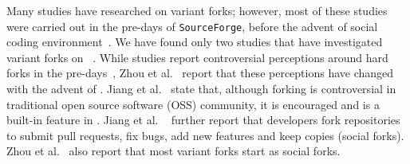 Many studies have researched on variant forks; however, most of these studies were carried out in the pre-\scp days of \texttt{SourceForge}, before the advent of social coding environment~\cite{Linus:2012Perspectives,Gregorio:2012,Viseur:2012Forks,Linus:2013CodeForking,Laurent:2008,Linus:2011ToFork}.
We have found only two studies that have investigated variant forks on \gh~\cite{businge2018appfamilies,Zhou:2020}.
While studies report controversial perceptions around hard forks in the pre-\gh days~\cite{Chua:Forking:2017,Dixion:2009Forks,Ernst:2010,Linus:2011ToFork,Linus:2014Hackers,Raymond:Cathedral:2001}, Zhou et al.~\cite{Zhou:2020} report that these perceptions have changed with the advent of \gh. Jiang et al.~\cite{Lo:2017} state that, although forking is controversial in traditional open source software (OSS) community, it is encouraged and is a built-in feature in \gh. Jiang et al. ~\cite{Lo:2017} further report that developers fork repositories to submit pull requests, fix bugs, add new features and keep copies (social forks).
Zhou et al.~\cite{Zhou:2020} also report that most variant forks start as social forks.

